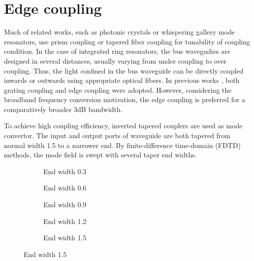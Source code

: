 \section{Edge coupling}\label{sec:edge}
Much of related works, such as photonic crystals or whispering gallery mode resonators, use prism coupling or tapered fiber coupling for tunability of coupling condition. 
In the case of integrated ring resonators, the bus wavegudies are designed in several distances, usually varying from under coupling to over coupling. 
Thus, the light confined in the bus waveguide can be directly coupled inwards or outwards using appropriate optical fibers. 
In previous works \cite{Sunada2018}, both grating coupling and edge coupling were adopted. However, considering the broadband frequency conversion motivation, the edge coupling is preferred for a comparatively broader 3dB bandwidth.

To achieve high coupling efficiency, inverted tapered couplers are used as mode convertor. The input and output ports of waveguide are both tapered from normal width 1.5 \um to a narrower end. By finite-difference time-domain (FDTD) methods, the mode field is swept with several taper end widths.

\begin{figure}
	\centering
	\begin{subfigure}[b]{0.33\textwidth}
		
		\caption{End width 0.3 \um}
	\end{subfigure}\hfill
	\begin{subfigure}[b]{0.33\textwidth}
		
		\caption{End width 0.6 \um}
	\end{subfigure}\hfill
	\begin{subfigure}[b]{0.33\textwidth}
		
		\caption{End width 0.9 \um}
	\end{subfigure}
	\vfill
	\begin{subfigure}[b]{0.33\textwidth}
		
		\caption{End width 1.2 \um}
	\end{subfigure}
	\begin{subfigure}[b]{0.33\textwidth}
		
		\caption{End width 1.5 \um}
	\end{subfigure}
	\label{fig:taper}
\end{figure}

